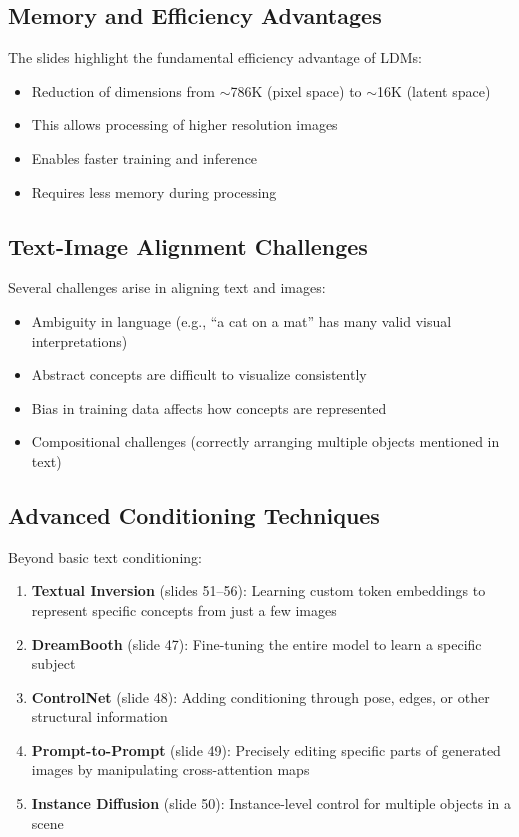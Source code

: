 \subsection*{Memory and Efficiency Advantages}
The slides highlight the fundamental efficiency advantage of LDMs:
\begin{itemize}
    \item Reduction of dimensions from $\sim$786K (pixel space) to $\sim$16K (latent space)
    \item This allows processing of higher resolution images
    \item Enables faster training and inference
    \item Requires less memory during processing
\end{itemize}

\subsection*{Text-Image Alignment Challenges}
Several challenges arise in aligning text and images:
\begin{itemize}
    \item Ambiguity in language (e.g., ``a cat on a mat'' has many valid visual interpretations)
    \item Abstract concepts are difficult to visualize consistently
    \item Bias in training data affects how concepts are represented
    \item Compositional challenges (correctly arranging multiple objects mentioned in text)
\end{itemize}

\subsection*{Advanced Conditioning Techniques}
Beyond basic text conditioning:
\begin{enumerate}
    \item \textbf{Textual Inversion} (slides 51--56): Learning custom token embeddings to represent specific concepts from just a few images
    \item \textbf{DreamBooth} (slide 47): Fine-tuning the entire model to learn a specific subject
    \item \textbf{ControlNet} (slide 48): Adding conditioning through pose, edges, or other structural information
    \item \textbf{Prompt-to-Prompt} (slide 49): Precisely editing specific parts of generated images by manipulating cross-attention maps
    \item \textbf{Instance Diffusion} (slide 50): Instance-level control for multiple objects in a scene
\end{enumerate}

